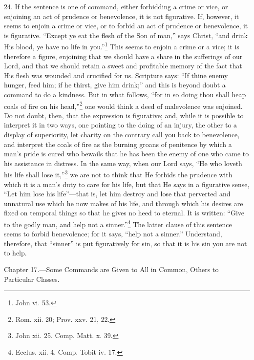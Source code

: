 24. If the sentence is one of command, either forbidding a crime or vice, or enjoining an act of prudence or benevolence, it is not figurative. If, however, it seems to enjoin a crime or vice, or to forbid an act of prudence or benevolence, it is figurative. “Except ye eat the flesh of the Son of man,” says Christ, “and drink His blood, ye have no life in you.”\footnote{John vi. 53.} This seems to enjoin a crime or a vice; it is therefore a figure, enjoining that we should have a share in the sufferings of our Lord, and that we should retain a sweet and profitable memory of the fact that His flesh was wounded and crucified for us. Scripture says: “If thine enemy hunger, feed him; if he thirst, give him drink;” and this is beyond doubt a command to do a kindness. But in what follows, “for in so doing thou shall heap coals of fire on his head,”\footnote{Rom. xii. 20; Prov. xxv. 21, 22.} one would think a deed of malevolence was enjoined. Do not doubt, then, that the expression is figurative; and, while it is possible to interpret it in two ways, one pointing to the doing of an injury, the other to a display of superiority, let charity on the contrary call you back to benevolence, and interpret the coals of fire as the burning groans of penitence by which a man’s pride is cured who bewails that he has been the enemy of one who came to his assistance in distress. In the same way, when our Lord says, “He who loveth his life shall lose it,”\footnote{John xii. 25. Comp. Matt. x. 39.} we are not to think that He forbids the prudence with which it is a man’s duty to care for his life, but that He says in a figurative sense, “Let him lose his life”—that is, let him destroy and lose that perverted and unnatural use which he now makes of his life, and through which his desires are fixed on temporal things so that he gives no heed to eternal. It is written: “Give to the godly man, and help not a sinner.”\footnote{Ecclus. xii. 4. Comp. Tobit iv. 17.} The latter clause of this sentence seems to forbid benevolence; for it says, “help not a sinner.” Understand, therefore, that “sinner” is put figuratively for sin, so that it is his sin you are not to help.


Chapter 17.—Some Commands are Given to All in Common, Others to Particular Classes.

